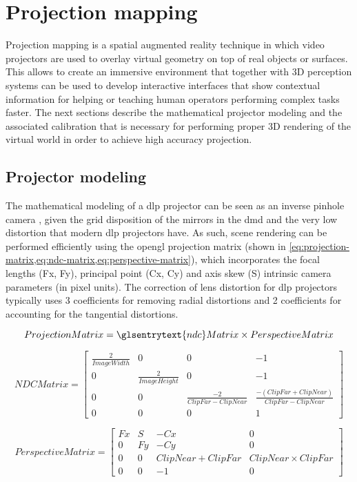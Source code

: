 \section{Projection mapping}\label{sec:projection-mapping}

Projection mapping is a spatial augmented reality \cite{Bimber2005} technique in which video projectors are used to overlay virtual geometry on top of real objects or surfaces. This allows to create an immersive environment that together with 3D perception systems can be used to develop interactive interfaces that show contextual information for helping or teaching human operators performing complex tasks faster. The next sections describe the mathematical projector modeling and the associated calibration that is necessary for performing proper 3D rendering of the virtual world in order to achieve high accuracy projection.


\subsection{Projector modeling}

The mathematical modeling of a \gls{dlp} projector can be seen as an inverse pinhole camera \cite{Hartley2003}, given the grid disposition of the mirrors in the \gls{dmd} and the very low distortion that modern \gls{dlp} projectors have. As such, scene rendering can be performed efficiently using the \gls{opengl} projection matrix (shown in \cref{eq:projection-matrix,eq:ndc-matrix,eq:perspective-matrix}), which incorporates the focal lengths (Fx, Fy), principal point (Cx, Cy) and axis skew (S) intrinsic camera parameters (in pixel units). The correction of lens distortion for \gls{dlp} projectors typically uses 3 coefficients for removing radial distortions and 2 coefficients for accounting for the tangential distortions.

{
	\scriptsize
	\begin{equation}\label{eq:projection-matrix}
	ProjectionMatrix = \glsentrytext{ndc}Matrix \times PerspectiveMatrix
	\end{equation}
	
	\begin{equation}\label{eq:ndc-matrix}
	NDCMatrix = 
	\begin{bmatrix}
	\frac{2}{ImageWidth} & 0 & 0 & -1 \\
	0 & \frac{2}{ImageHeight} & 0 & -1 \\
	0 & 0 & \frac{-2}{ClipFar - ClipNear} & \frac{-(ClipFar + ClipNear)}{ClipFar - ClipNear} \\
	0 & 0 & 0 & 1
	\end{bmatrix}
	\end{equation}
	
	
	\begin{equation}\label{eq:perspective-matrix}
	PerspectiveMatrix = 
	\begin{bmatrix}
	Fx & S & -Cx & 0 \\
	0 & Fy & -Cy & 0 \\
	0 & 0 & ClipNear + ClipFar & ClipNear \times ClipFar \\
	0 & 0 & -1 & 0
	\end{bmatrix}
	\end{equation}
}


